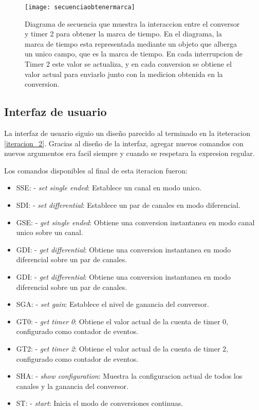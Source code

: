 \begin{figure}[h]
  \centering
  \texttt{[image: secuenciaobtenermarca]}
  \caption[Diagrama de secuencia para la obtencion de una marca de tiempo]{Diagrama de secuencia que muestra la interaccion entre el conversor y timer 2 para obtener la marca de tiempo. En el diagrama, la marca de tiempo esta representada mediante un objeto que alberga un unico campo, que es la marca de tiempo. En cada interrupcion de Timer 2 este valor se actualiza, y en cada conversion se obtiene el valor actual para enviarlo junto con la medicion obtenida en la conversion.}\label{fig:secuenciaobtenermarca}
\end{figure}



\subsection{Interfaz de usuario} %
\label{it5:sub:interfaz_de_usuario}

La interfaz de usuario siguio un diseño parecido al terminado en la iteteracion \ref{iteracion_2}. Gracias al diseño de la interfaz, agregar nuevos comandos con nuevos argumentos era facil siempre y cuando se respetara la expresion regular.

Los comandos disponibles al final de esta iteracion fueron:

\begin{itemize}
  \item SSE: - \textit{set single ended}: Establece un canal en modo unico.
  \item SDI: - \textit{set differential}: Establece un par de canales en modo diferencial.
  \item GSE: - \textit{get single ended}: Obtiene una conversion instantanea en modo canal unico sobre un canal.
  \item GDI: - \textit{get differential}: Obtiene una conversion instantanea en modo diferencial sobre un par de canales.
  \item GDI: - \textit{get differential}: Obtiene una conversion instantanea en modo diferencial sobre un par de canales.
  \item SGA: - \textit{set gain}: Establece el nivel de ganancia del conversor.
  \item GT0: - \textit{get timer 0}: Obtiene el valor actual de la cuenta de timer 0, configurado como contador de eventos.
  \item GT2: - \textit{get timer 2}: Obtiene el valor actual de la cuenta de timer 2, configurado como contador de eventos.
  \item SHA: - \textit{show configuration}: Muestra la configuracion actual de todos los canales y la ganancia del conversor.
  \item ST: - \textit{start}: Inicia el modo de conversiones continuas.
\end{itemize}

